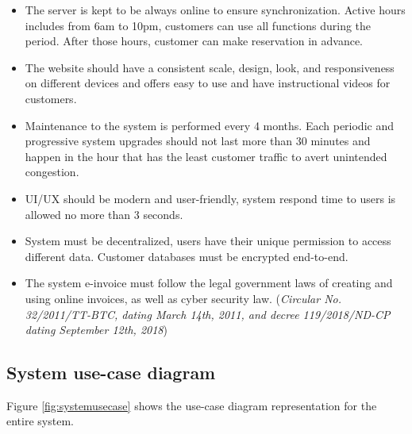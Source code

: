 \documentclass[12pt, a4paper]{article}
\theoremstyle{styleth}
\theoremstyle{styledef}
\begin{document}
\begin{itemize}
	\item The server is kept to be always online to ensure synchronization. Active hours includes from 6am to 10pm, customers can use all functions during the period. After those hours, customer can make reservation in advance.
	
	\item The website should have a consistent scale, design, look, and responsiveness on different devices and offers easy to use and have instructional videos for customers.
	
	\item Maintenance to the system is performed every 4 months. Each periodic and progressive system upgrades should not last more than 30 minutes and happen in the hour that has the least customer traffic to avert unintended congestion.
	
	\item UI/UX should be modern and user-friendly, system respond time to users is allowed no more than 3 seconds.
	
	\item System must be decentralized, users have their unique permission to access different data. Customer databases must be encrypted end-to-end.
		
	\item The system e-invoice must follow the legal government laws of creating and using online invoices, as well as cyber security law. (\textit{Circular No. 32/2011/TT-BTC, dating March 14th, 2011, and decree 119/2018/ND-CP dating September 12th, 2018})

\end{itemize}

\newpage
\subsection{System use-case diagram}
Figure \ref{fig:systemusecase} shows the use-case diagram representation for the entire system.
\end{document}
